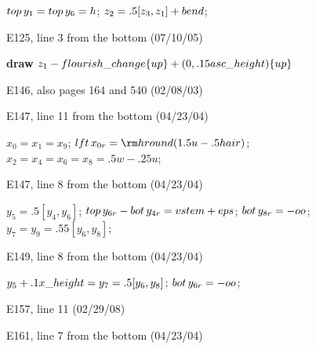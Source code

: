 {{{\ninepoint\noindent
$\\{top}\,y_1=\\{top}\,y_6=h$; $z_2=.5[z_3,z_1]+\\{bend}$;

\bugonpage E125, line 3 from the bottom (07/10/05)

\ninepoint\noindent
{\bf draw} $z_1-\\{flourish\_change}\{\\{up}\}+(0,.15\\{asc\_height})
 \{\\{up}\}$\par
{}

\bugonpage E146, also pages 164 and 540 (02/08/03)

\eightpoint{}

\bugonpage E147, line 11 from the bottom (04/23/04)

\ninepoint\noindent
$x_0=x_1=x_9$; $\\{lft}\,x_{0r}={\rm hround}(1.5u-.5\\{hair})$;
$x_2=x_4=x_6=x_8=.5w-.25u$;

\bugonpage E147, line 8 from the bottom (04/23/04)

\ninepoint\noindent
$y_5=.5[y_4,y_6]$; $\\{top}\,y_{6r}-\\{bot}\,y_{4r}=\\{vstem}+\\{eps}$;
 $\\{bot}\,y_{8r}=-\\{oo}$; $y_7=y_9=.55[y_6,y_8]$;

\bugonpage E149, line 8 from the bottom (04/23/04)

\ninepoint\noindent
$y_5+.1\\{x\_height}=y_7=.5[y_6,y_8]$; $\\{bot}\,y_{6r}=-\\{oo}$;

\bugonpage E157, line 11 (02/29/08)

\ninepoint\noindent
{}

\bugonpage E161, line 7 from the bottom (04/23/04)

}}}
